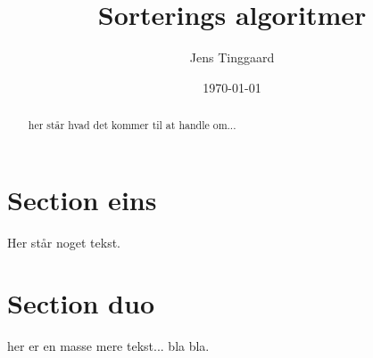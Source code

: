 \documentclass[12pt]{article}
\date{\today}
\title{Sorterings algoritmer}
\author{Jens Tinggaard}
\begin{document}
\clearpage\maketitle
\thispagestyle{empty}
\maketitle
\begin{abstract}
her står hvad det kommer til at handle om...
\end{abstract}

\newpage
\tableofcontents

\newpage
\section{Section eins}
Her står noget tekst.
\newpage
\section{Section duo}
her er en masse mere tekst...
bla bla.
\end{document}
